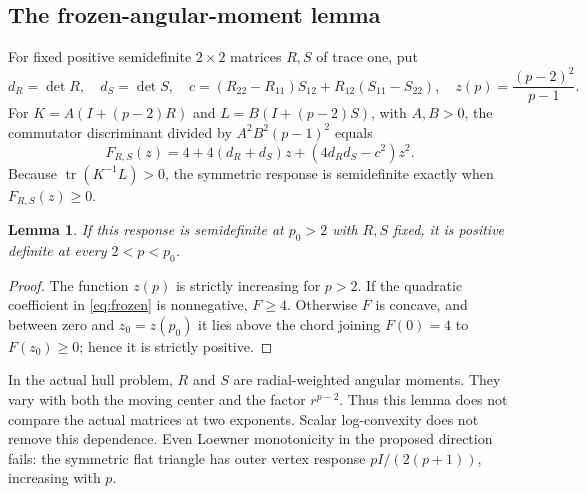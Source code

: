 \documentclass[11pt]{article}
\newtheorem{lemma}[theorem]{Lemma}
\theoremstyle{definition}
\newcommand{\tr}{\operatorname{tr}}
\begin{document}
\subsection{The frozen-angular-moment lemma}
For fixed positive semidefinite $2\times2$ matrices $R,S$ of trace one,
put
\[
 d_R=\det R,\quad d_S=\det S,\quad
 c=(R_{22}-R_{11})S_{12}+R_{12}(S_{11}-S_{22}),\quad
 z(p)=\frac{(p-2)^2}{p-1}.
\]
For $K=A(I+(p-2)R)$ and $L=B(I+(p-2)S)$, with $A,B>0$, the commutator
discriminant divided by $A^2B^2(p-1)^2$ equals
\begin{equation}\label{eq:frozen}
 F_{R,S}(z)=4+4(d_R+d_S)z+(4d_Rd_S-c^2)z^2.
\end{equation}
Because $\tr(K^{-1}L)>0$, the symmetric response is semidefinite exactly
when $F_{R,S}(z)\ge0$.
\begin{lemma}
If this response is semidefinite at $p_0>2$ with $R,S$ fixed, it is
positive definite at every $2<p<p_0$.
\end{lemma}
\begin{proof}
The function $z(p)$ is strictly increasing for $p>2$. If the quadratic
coefficient in \eqref{eq:frozen} is nonnegative, $F\ge4$. Otherwise $F$
is concave, and between zero and $z_0=z(p_0)$ it lies above the chord
joining $F(0)=4$ to $F(z_0)\ge0$; hence it is strictly positive.
\end{proof}
In the actual hull problem, $R$ and $S$ are radial-weighted angular moments.
They vary with both the moving center and the factor $r^{p-2}$. Thus this
lemma does not compare the actual matrices at two exponents. Scalar
log-convexity does not remove this dependence. Even Loewner monotonicity
in the proposed direction fails: the symmetric flat triangle has outer
vertex response $pI/(2(p+1))$, increasing with $p$.
\end{document}
